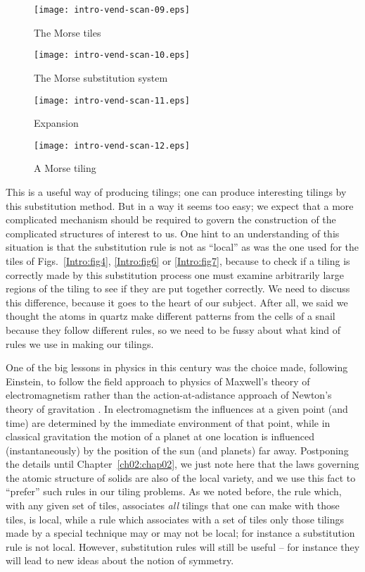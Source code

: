 \documentclass[reqno]{stml-l}
\theoremstyle{plain}
\theoremstyle{definition}
\numberwithin{equation}{chapter}
\begin{document}
\begin{figure}[!h]
\texttt{[image: intro-vend-scan-09.eps]}
\caption{The Morse tiles}\label{Intro:fig9}
\end{figure}

\begin{figure}[!h]
\texttt{[image: intro-vend-scan-10.eps]}
\caption{The Morse substitution system}\label{Intro:fig10}
\end{figure}

\begin{figure}[!h]
\texttt{[image: intro-vend-scan-11.eps]}
\caption{Expansion}\label{Intro:fig11}
\end{figure}

\begin{figure}[!h]
\texttt{[image: intro-vend-scan-12.eps]}
\caption{A Morse tiling}\label{Intro:fig12}
\end{figure}

This is a useful way of producing tilings; one can produce interesting tilings by this substitution method. But in a way it seems too easy; we expect that a more complicated mechanism should be required to govern the construction of the complicated structures of interest to us. One hint to an understanding of this situation is that the substitution rule is not as ``local'' as was the one used for the tiles of Figs.~\ref{Intro:fig4}, \ref{Intro:fig6} or \ref{Intro:fig7}, because to check if a tiling is correctly made by this substitution process one must examine arbitrarily large regions of the tiling to see if they are put together correctly. We need to discuss this difference, because it goes to the heart of our subject. After all, we said we thought the atoms in quartz make different patterns from the cells of a snail because they follow different rules, so we need to be fussy about what kind of rules we use in making our tilings.

One of the big lessons in physics in this century was the choice made, following Einstein, to follow the field approach to physics of Maxwell's theory of electromagnetism rather than the action-at-adistance approach of Newton's theory of gravitation \cite{bib:EiI}. In electromagnetism the influences at a given point (and time) are determined by the immediate environment of that point, while in classical gravitation the motion of a planet at one location is influenced (instantaneously) by the position of the sun (and planets) far away. Postponing the details until Chapter~\ref{ch02:chap02}, we just note here that the laws governing the atomic structure of solids are also of the local variety, and we use this fact to ``prefer'' such rules in our tiling problems. As we noted before, the rule which, with any given set of tiles, associates \emph{all} tilings that one can make with those tiles, is local, while a rule which associates with a set of tiles only those tilings made by a special technique may or may not be local; for instance a substitution rule is not local. However, substitution rules will still be useful -- for instance they will lead to new ideas about the notion of symmetry.
\end{document}
